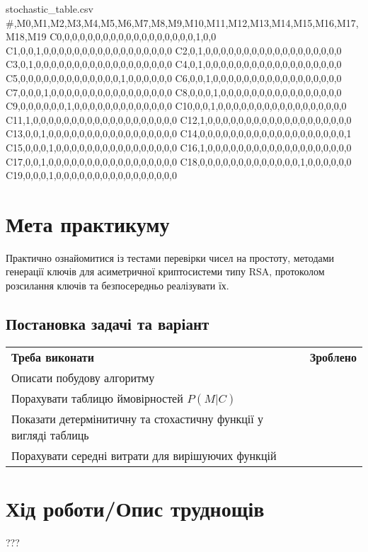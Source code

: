 \begin{filecontents*}{stochastic_table.csv}
#,M0,M1,M2,M3,M4,M5,M6,M7,M8,M9,M10,M11,M12,M13,M14,M15,M16,M17,M18,M19
C0,0,0,0,0,0,0,0,0,0,0,0,0,0,0,0,0,0,1,0,0
C1,0,0,1,0,0,0,0,0,0,0,0,0,0,0,0,0,0,0,0,0
C2,0,1,0,0,0,0,0,0,0,0,0,0,0,0,0,0,0,0,0,0
C3,0,1,0,0,0,0,0,0,0,0,0,0,0,0,0,0,0,0,0,0
C4,0,1,0,0,0,0,0,0,0,0,0,0,0,0,0,0,0,0,0,0
C5,0,0,0,0,0,0,0,0,0,0,0,0,0,1,0,0,0,0,0,0
C6,0,0,1,0,0,0,0,0,0,0,0,0,0,0,0,0,0,0,0,0
C7,0,0,0,1,0,0,0,0,0,0,0,0,0,0,0,0,0,0,0,0
C8,0,0,0,1,0,0,0,0,0,0,0,0,0,0,0,0,0,0,0,0
C9,0,0,0,0,0,0,1,0,0,0,0,0,0,0,0,0,0,0,0,0
C10,0,0,1,0,0,0,0,0,0,0,0,0,0,0,0,0,0,0,0,0
C11,1,0,0,0,0,0,0,0,0,0,0,0,0,0,0,0,0,0,0,0
C12,1,0,0,0,0,0,0,0,0,0,0,0,0,0,0,0,0,0,0,0
C13,0,0,1,0,0,0,0,0,0,0,0,0,0,0,0,0,0,0,0,0
C14,0,0,0,0,0,0,0,0,0,0,0,0,0,0,0,0,0,0,0,1
C15,0,0,0,1,0,0,0,0,0,0,0,0,0,0,0,0,0,0,0,0
C16,1,0,0,0,0,0,0,0,0,0,0,0,0,0,0,0,0,0,0,0
C17,0,0,1,0,0,0,0,0,0,0,0,0,0,0,0,0,0,0,0,0
C18,0,0,0,0,0,0,0,0,0,0,0,0,0,1,0,0,0,0,0,0
C19,0,0,0,1,0,0,0,0,0,0,0,0,0,0,0,0,0,0,0,0
\end{filecontents*}

\section{Мета практикуму}
Практично ознайомитися із тестами перевірки чисел на простоту, методами генерації ключів для асиметричної криптосистеми типу RSA, протоколом розсилання ключів та безпосередньо реалізувати їх.

\subsection{Постановка задачі та варіант}
\begin{tabularx}{\textwidth}{X|X}
	\textbf{Треба виконати} & \textbf{Зроблено} \\
	Описати побудову алгоритму \checkmark\\
	Порахувати таблицю ймовірностей $P(\textit{M}|\textit{C})$ \checkmark\\
	Показати детермінитичну та стохастичну функції у вигляді таблиць & \checkmark\\
	Порахувати середні витрати для вирішуючих функцій & \checkmark\\
\end{tabularx}



\section{Хід роботи/Опис труднощів}
???


